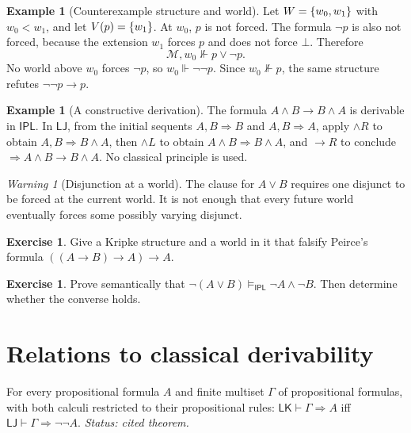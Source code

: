 \documentclass[11pt,oneside,openany]{book}
\theoremstyle{definition}
\newtheorem{example}[definition]{Example}
\newtheorem{exercise}[definition]{Exercise}
\theoremstyle{plain}
\newtheorem{theorem}[definition]{Theorem}
\theoremstyle{remark}
\newtheorem{warning}[definition]{Warning}
\let\LogicTheorem\theorem
\let\endLogicTheorem\endtheorem
\renewenvironment{theorem}[1][]{%
  \LogicTheorem[#1]%
  \if\relax\detokenize{#1}\relax\else\index{#1}\fi
}{\endLogicTheorem}
\DeclarePairedDelimiter{\set}{\lbrace}{\rbrace}
\newcommand{\entails}{\models}
\newcommand{\derives}{\vdash}
\newcommand{\bottom}{\bot}
\newcommand{\forces}{\Vdash}
\newcommand{\LK}{\mathsf{LK}}
\newcommand{\LJ}{\mathsf{LJ}}
\newcommand{\IPL}{\mathsf{IPL}}
\begin{document}
\begin{example}[Counterexample structure and world]
Let \(W=\set{w_0,w_1}\) with \(w_0<w_1\), and let
\(V(p)=\set{w_1}\).  At \(w_0\), \(p\) is not forced.  The formula
\(\neg p\) is also not forced, because the extension \(w_1\) forces \(p\) and
does not force \(\bottom\).  Therefore
\[
  \mathcal M,w_0\not\forces p\lor\neg p.
\]
No world above \(w_0\) forces \(\neg p\), so
\(w_0\forces\neg\neg p\).  Since \(w_0\not\forces p\), the same structure
refutes \(\neg\neg p\to p\).
\end{example}

\begin{example}[A constructive derivation]
The formula \(A\land B\to B\land A\) is derivable in \(\IPL\).  In
\(\LJ\), from the initial sequents \(A,B\Rightarrow B\) and
\(A,B\Rightarrow A\), apply \(\land R\) to obtain
\(A,B\Rightarrow B\land A\), then \(\land L\) to obtain
\(A\land B\Rightarrow B\land A\), and \(\to R\) to conclude
\(\Rightarrow A\land B\to B\land A\).  No classical principle is used.
\end{example}

\begin{warning}[Disjunction at a world]
The clause for \(A\lor B\) requires one disjunct to be forced at the current
world.  It is not enough that every future world eventually forces some
possibly varying disjunct.
\end{warning}

\begin{exercise}
\label{ex:intuitionistic-logic-01}
Give a Kripke structure and a world in it that falsify Peirce's formula
\(((A\to B)\to A)\to A\).
\end{exercise}

\begin{exercise}
\label{ex:intuitionistic-logic-02}
Prove semantically that
\(\neg(A\lor B)\entails_{\IPL}\neg A\land\neg B\).  Then determine whether the
converse holds.
\end{exercise}

\section{Relations to classical derivability}
\label{sec:intuitionistic-classical}

\begin{theorem}[Glivenko]
\label{thm:glivenko}
For every propositional formula \(A\) and finite multiset \(\Gamma\) of
propositional formulas, with both calculi restricted to their propositional
rules:
\(\LK\derives\Gamma\Rightarrow A\) iff
\(\LJ\derives\Gamma\Rightarrow\neg\neg A\).
\textit{Status: cited theorem.}
\end{theorem}
\end{document}
